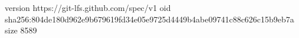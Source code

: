 version https://git-lfs.github.com/spec/v1
oid sha256:804de180d962e9b679619fd34e05e9725d4449b4abe09741c88c626c15b9eb7a
size 8589

